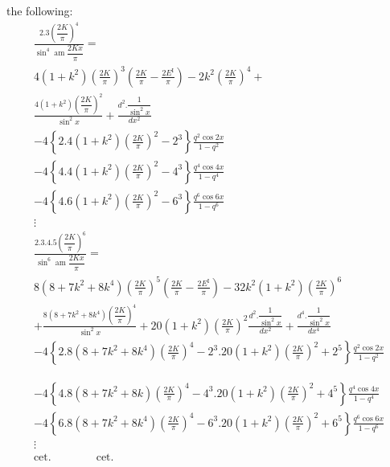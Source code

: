 \documentclass{article}
\begin{document}
the following:
\[
\begin{gathered}
\frac{2.3\left(\dfrac{2K}{\pi}\right)^{4}}{\sin^{4}\operatorname{am}\dfrac{2Kx}{\pi}}=\\[1.5ex]
4(1+k^{2})\left(\frac{2K}{\pi}\right)^{3}\left(\frac{2K}{\pi}-\frac{2E^{\mathrm{I}}}{\pi}\right)-2k^{2}\left(\frac{2K}{\pi}\right)^{4}+\\[1.5ex]
\frac{4(1+k^{2})\left(\dfrac{2K}{\pi}\right)^{2}}{\sin^{2}x}+\frac{d^{2}.\dfrac{1}{\sin^{2}x}}{dx^{2}}\\[1.5ex]
-4\left\{2.4(1+k^{2})\left(\frac{2K}{\pi}\right)^{2}-2^{3}\right\}\frac{q^{2}\cos 2x}{1-q^{2}}\\[1.5ex]
-4\left\{4.4(1+k^{2})\left(\frac{2K}{\pi}\right)^{2}-4^{3}\right\}\frac{q^{4}\cos 4x}{1-q^{4}}\\[1.5ex]
-4\left\{4.6(1+k^{2})\left(\frac{2K}{\pi}\right)^{2}-6^{3}\right\}\frac{q^{6}\cos 6x}{1-q^{6}}\\[1.5ex]
\vdots\\[1.5ex]
\frac{2.3.4.5\left(\dfrac{2K}{\pi}\right)^{6}}{\sin^{6}\operatorname{am}\dfrac{2Kx}{\pi}}=\\[1.5ex]
8(8+7k^{2}+8k^{4})\left(\frac{2K}{\pi}\right)^{5}\left(\frac{2K}{\pi}-\frac{2E^{\mathrm{I}}}{\pi}\right)-32k^{2}(1+k^{2})\left(\frac{2K}{\pi}\right)^{6}\\[1.5ex]
+\frac{8(8+7k^{2}+8k^{4})\left(\dfrac{2K}{\pi}\right)^{4}}{\sin^{2}x}+20(1+k^{2})\left(\frac{2K}{\pi}\right)^{2}\frac{d^{2}.\dfrac{1}{\sin^{2}x}}{dx^{2}}+\frac{d^{4}.\dfrac{1}{\sin^{2}x}}{dx^{4}}\\[1.5ex]
-4\left\{2.8(8+7k^{2}+8k^{4})\left(\frac{2K}{\pi}\right)^{4}-2^{3}.20(1+k^{2})\left(\frac{2K}{\pi}\right)^{2}+2^{5}\right\}\frac{q^{2}\cos 2x}{1-q^{2}}
\end{gathered}
\]

\[
\begin{gathered}
-4\left\{4.8(8+7k^{2}+8k)\left(\frac{2K}{\pi}\right)^{4}-4^{3}.20(1+k^{2})\left(\frac{2K}{\pi}\right)^{2}+4^{5}\right\}\frac{q^{4}\cos 4x}{1-q^{4}}\\[1.5ex]
-4\left\{6.8(8+7k^{2}+8k^{4})\left(\frac{2K}{\pi}\right)^{4}-6^{3}.20(1+k^{2})\left(\frac{2K}{\pi}\right)^{2}+6^{5}\right\}\frac{q^{6}\cos 6x}{1-q^{6}}\\[1.5ex]
\vdots\\[1.5ex]
\text{cet.}\qquad\qquad\text{cet.}
\end{gathered}
\]
\end{document}
